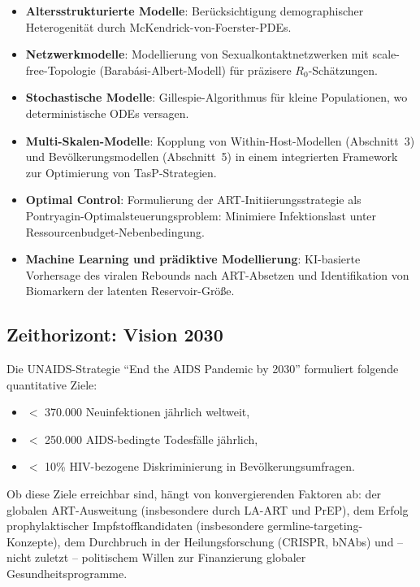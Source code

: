 ﻿\documentclass[a4paper,12pt]{article}
\theoremstyle{definition}
\begin{document}
\begin{itemize}
\item \textbf{Altersstrukturierte Modelle}: Ber\"ucksichtigung demographischer
      Heterogenit\"at durch McKendrick-von-Foerster-PDEs.
\item \textbf{Netzwerkmodelle}: Modellierung von Sexualkontaktnetzwerken mit
      scale-free-Topologie (Barab\'asi-Albert-Modell) f\"ur pr\"azisere
      $R_0$-Sch\"atzungen.
\item \textbf{Stochastische Modelle}: Gillespie-Algorithmus f\"ur kleine
      Populationen, wo deterministische ODEs versagen.
\item \textbf{Multi-Skalen-Modelle}: Kopplung von Within-Host-Modellen
      (Abschnitt~3) und Bev\"olkerungsmodellen (Abschnitt~5) in einem
      integrierten Framework zur Optimierung von TasP-Strategien.
\item \textbf{Optimal Control}: Formulierung der ART-Initiierungsstrategie
      als Pontryagin-Optimalsteuerungsproblem: Minimiere Infektionslast unter
      Ressourcenbudget-Nebenbedingung.
\item \textbf{Machine Learning und pr\"adiktive Modellierung}: KI-basierte
      Vorhersage des viralen Rebounds nach ART-Absetzen und Identifikation
      von Biomarkern der latenten Reservoir-Gr\"o\ss e.
\end{itemize}

\subsection{Zeithorizont: Vision 2030}

Die UNAIDS-Strategie ``End the AIDS Pandemic by 2030'' formuliert folgende
quantitative Ziele:
\begin{itemize}
\item $<$ 370.000 Neuinfektionen j\"ahrlich weltweit,
\item $<$ 250.000 AIDS-bedingte Todesfälle j\"ahrlich,
\item $<$ 10\% HIV-bezogene Diskriminierung in Bev\"olkerungsumfragen.
\end{itemize}

Ob diese Ziele erreichbar sind, h\"angt von konvergierenden Faktoren ab:
der globalen ART-Ausweitung (insbesondere durch LA-ART und PrEP),
dem Erfolg prophylaktischer Impfstoffkandidaten (insbesondere germline-targeting-Konzepte),
dem Durchbruch in der Heilungsforschung (CRISPR, bNAbs) und -- nicht zuletzt --
politischem Willen zur Finanzierung globaler Gesundheitsprogramme.
\end{document}
